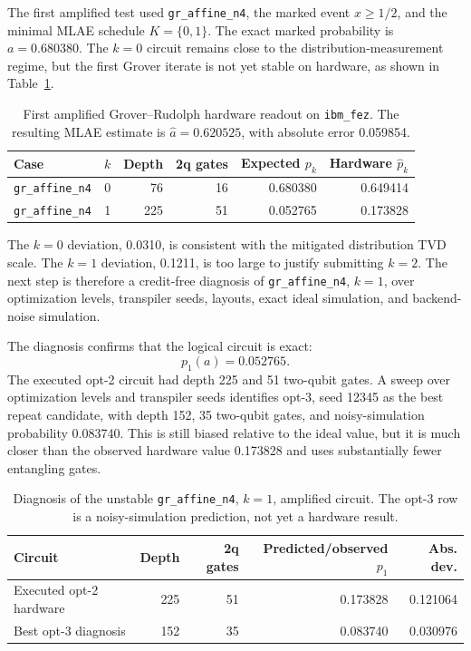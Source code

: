 The first amplified test used \texttt{gr\_affine\_n4}, the marked event
\(x\ge 1/2\), and the minimal MLAE schedule \(K=\{0,1\}\). The exact marked
probability is \(a=0.680380\). The \(k=0\) circuit remains close to the
distribution-measurement regime, but the first Grover iterate is not yet stable
on hardware, as shown in Table~\ref{tab:phase4-gr-mlae-results}.

\begin{table}[h]
\centering
\begin{tabular}{lrrrrr}
\toprule
Case & \(k\) & Depth & 2q gates & Expected \(p_k\) & Hardware \(\hat p_k\) \\
\midrule
\texttt{gr\_affine\_n4} & 0 & 76 & 16 & 0.680380 & 0.649414 \\
\texttt{gr\_affine\_n4} & 1 & 225 & 51 & 0.052765 & 0.173828 \\
\bottomrule
\end{tabular}
\caption{First amplified Grover--Rudolph hardware readout on \texttt{ibm\_fez}.
The resulting MLAE estimate is \(\hat a=0.620525\), with absolute error
0.059854.}
\label{tab:phase4-gr-mlae-results}
\end{table}

The \(k=0\) deviation, 0.0310, is consistent with the mitigated distribution TVD
scale. The \(k=1\) deviation, 0.1211, is too large to justify submitting
\(k=2\). The next step is therefore a credit-free diagnosis of
\texttt{gr\_affine\_n4}, \(k=1\), over optimization levels, transpiler seeds,
layouts, exact ideal simulation, and backend-noise simulation.

The diagnosis confirms that the logical circuit is exact:
\[
  p_1(a)=0.052765.
\]
The executed opt-2 circuit had depth 225 and 51 two-qubit gates. A sweep over
optimization levels and transpiler seeds identifies opt-3, seed 12345 as the
best repeat candidate, with depth 152, 35 two-qubit gates, and noisy-simulation
probability 0.083740. This is still biased relative to the ideal value, but it
is much closer than the observed hardware value 0.173828 and uses substantially
fewer entangling gates.

\begin{table}[h]
\centering
\begin{tabular}{lrrrr}
\toprule
Circuit & Depth & 2q gates & Predicted/observed \(p_1\) & Abs. dev. \\
\midrule
Executed opt-2 hardware & 225 & 51 & 0.173828 & 0.121064 \\
Best opt-3 diagnosis & 152 & 35 & 0.083740 & 0.030976 \\
\bottomrule
\end{tabular}
\caption{Diagnosis of the unstable \texttt{gr\_affine\_n4}, \(k=1\), amplified
circuit. The opt-3 row is a noisy-simulation prediction, not yet a hardware
result.}
\label{tab:gr-affine-k1-diagnosis}
\end{table}


